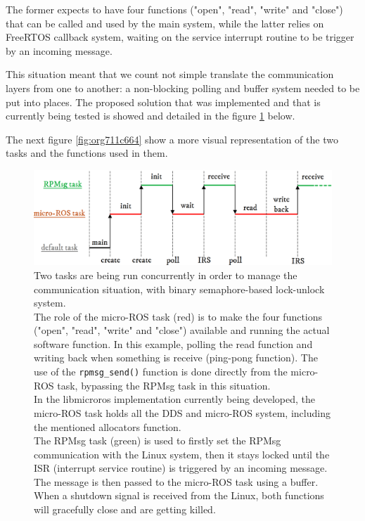 \documentclass[10pt]{article}
\begin{document}
The former expects to have four functions ("open", "read", "write" and "close") that can
be called and used by the main system, while the latter relies on FreeRTOS callback
system, waiting on the service interrupt routine to be trigger by an incoming message.

This situation meant that we count not simple translate the communication layers from one
to another: a non-blocking polling and buffer system needed to be put into places.
The proposed solution that was implemented and that is currently being tested
is showed and detailed in the figure \ref{fig:org90bae0a} below.

The next figure \ref{fig:org711c664} show a more visual representation of the two tasks and the
functions used in them.

\begin{figure}[htbp]
\centering
\includegraphics[width=.9\textwidth]{./img/tasks.png}
\caption{\label{fig:org90bae0a}Two tasks are being run concurrently in order to manage the communication situation, with binary semaphore-based lock-unlock system.\\[0pt]
 The role of the micro-ROS task (red) is to make the four functions ("open", "read", "write" and "close")  available and running the actual software function. In this example, polling the read function and writing back when something is receive (ping-pong function). The use of the \texttt{rpmsg\_send()} function is done directly from the micro-ROS task, bypassing the RPMsg task in this situation.\\[0pt]
 In the libmicroros implementation currently being developed, the micro-ROS task holds all the DDS and micro-ROS system, including the mentioned allocators function.\\[0pt]
 The RPMsg task (green) is used to firstly set the RPMsg communication with the Linux system, then it stays locked until the ISR (interrupt service routine) is triggered by an incoming message. The message is then passed to the micro-ROS task using a buffer.\\[0pt]
 When a shutdown signal is received from the Linux, both functions will gracefully close and are getting killed.}
\end{figure}
\end{document}
